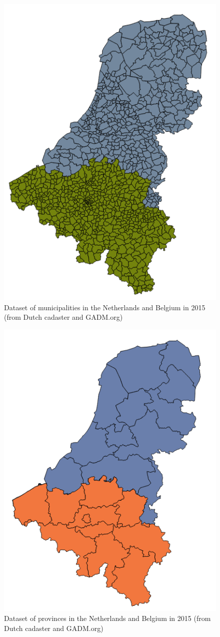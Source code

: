 \begin{figure}
	\centering
	\includegraphics[width=0.5\linewidth]{figs/Municipalities.png}
	\caption{Dataset of municipalities in the Netherlands and Belgium in 2015 (from Dutch cadaster and GADM.org)}
	\label{fig:municipalities}
\end{figure}

\begin{figure}
	\centering
	\includegraphics[width=0.5\linewidth]{figs/Provinces.png}
	\caption{Dataset of provinces in the Netherlands and Belgium in 2015 (from Dutch cadaster and GADM.org)}
	\label{fig:provinces}
\end{figure}

